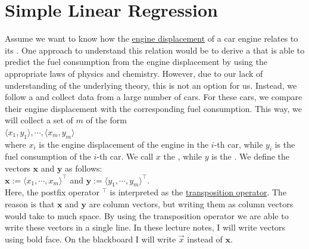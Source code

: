 \section{Simple Linear Regression}
Assume we want to know how the \href{https://en.wikipedia.org/wiki/Engine_displacement}{engine displacement} of
a car engine relates to its .  One approach to understand this relation would be to derive a
 that is able to predict the fuel consumption from the engine displacement by using the
appropriate laws of physics and chemistry.  However, due to our lack of understanding of the underlying theory,
this is not an option for us.  Instead, we follow a  and collect data from a large number
of cars.  For these cars, we compare their engine displacement with the corresponding fuel consumption.  This
way, we will collect a set of $m$  of the form
\\[0.2cm]
\hspace*{1.3cm}
$\langle x_1, y_1\rangle, \cdots, \langle x_m, y_m\rangle$ 
\\[0.2cm]
where $x_i$ is the engine displacement of the engine in the $i$-th car, while $y_i$ is the fuel consumption of the
$i$-th car.  We call $x$ the ,  while $y$ is the 
.   We define the vectors $\mathbf{x}$ and $\mathbf{y}$ as follows:
\\[0.2cm]
\hspace*{1.3cm}
$\mathbf{x} := \langle x_1, \cdots, x_m \rangle^\top$ \quad and \quad
$\mathbf{y} := \langle y_1, \cdots, y_m \rangle^\top$.
\\[0.2cm]
Here, the postfix operator $^\top$ is interpreted as the
\href{https://en.wikipedia.org/wiki/Transpose}{transposition operator}.
The reason is that $\mathbf{x}$ and $\mathbf{y}$ are column vectors, but writing them as column vectors
would take to much space.  By using the transposition operator we are able to write these vectors in a single 
line.  In these lecture notes, I will write vectors using bold face.  On the blackboard I will write $\vec{x}$
instead of $\mathbf{x}$.

